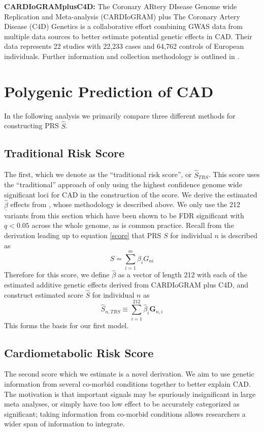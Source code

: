 \textbf{CARDIoGRAMplusC4D:} The Coronary ARtery DIsease Genome wide Replication and Meta-analysis (CARDIoGRAM) plus The Coronary Artery Disease (C4D) Genetics is a collaborative effort combining \ac{GWAS} data from multiple data sources to better estimate potential genetic effects in \ac{CAD}. Their data represents 22 studies with 22,233 cases and 64,762 controls of European individuals. Further information and collection methodology is outlined in \cite{TheCARDIoGRAMplusC4DConsortium2015}.


\section{Polygenic Prediction of CAD}

In the following analysis we primarily compare three different methods for constructing \ac{PRS} $\hat{S}$.

\subsection{Traditional Risk Score}

The first, which we denote as the ``traditional risk score'', or $\hat{S}_{TRS}$. This score uses the ``traditional'' approach of only using the highest confidence genome wide significant loci for \ac{CAD} in the construction of the score. We derive the estimated $\underline{\hat{\beta}}$ effects from \citep{TheCARDIoGRAMplusC4DConsortium2015}, whose methodology is described above. We only use the 212 variants from this section which have been shown to be FDR significant with $q < 0.05$ across the whole genome, as is common practice. Recall from the derivation leading up to equation \ref{score} that \ac{PRS} $S$ for individual $n$ is described as  $$ S = \sum^m_{i=1} \beta_i G_{ni} $$ Therefore for this score, we define $\hat{\beta}$ as a vector of length 212 with each of the estimated additive genetic effects derived from CARDIoGRAM plus C4D, and construct estimated score $\hat{S}$ for individual $n$ as $$ \hat{S}_{n, TRS} \equiv \sum^{212}_{i = 1} \hat{\beta}_i \mathbf{G}_{n, i} $$ This forms the basis for our first model.

\subsection{Cardiometabolic Risk Score}
\label{cmb-rs}

The second score which we estimate is a novel derivation. We aim to use genetic information from several co-morbid conditions together to better explain \ac{CAD}. The motivation is that important signals may be spuriously insignificant in large meta analyses, or simply have too low effect to be accurately categorized as significant; taking information from co-morbid conditions allows researchers a wider span of information to integrate. 

